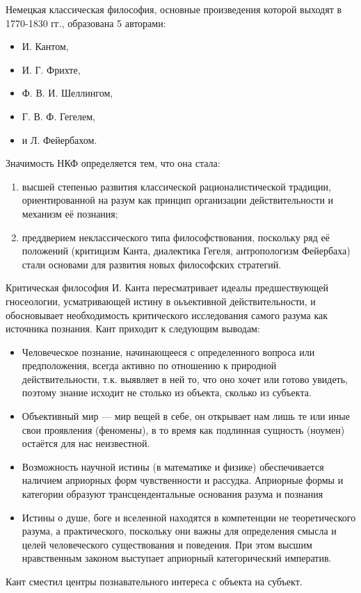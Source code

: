 
Немецкая классическая философия, основные произведения которой выходят в 1770-1830 гг., образована 5 авторами:
\begin{itemize}
    \item И. Кантом,
    \item И. Г. Фрихте,
    \item Ф. В. И. Шеллингом,
    \item Г. В. Ф. Гегелем,
    \item и Л. Фейербахом.
\end{itemize}

Значимость НКФ определяется тем, что она стала:
\begin{enumerate}
    \item высшей степенью развития классической рационалистической традиции, ориентированной на разум как принцип организации действительности и механизм её познания;
    \item преддверием неклассического типа философствования, поскольку ряд её положений (критицизм Канта, диалектика Гегеля, антропологизм Фейербаха) стали основами для развития новых философских стратегий.
\end{enumerate}

Критическая философия И. Канта пересматривает идеалы предшествующей гносеологии, усматривающей истину в оьъективной действительности, и обосновывает необходимость критического исследования самого разума как источника познания. Кант приходит к следующим выводам:
\begin{itemize}
    \item Человеческое познание, начинающееся с определенного вопроса или предположения, всегда активно по отношению к природной действительности, т.к. выявляет в ней то, что оно хочет или готово увидеть, поэтому знание исходит не столько из объекта, сколько из субъекта.
    \item Объективный мир --- мир вещей в себе, он открывает нам лишь те или иные свои проявления (феномены), в то время как подлинная сущность (ноумен) остаётся для нас неизвестной.
    \item Возможность научной истины (в математике и физике) обеспечивается наличием априорных форм чувственности и рассудка. Априорные формы и категории образуют трансцендентальные основания разума и познания
    \item Истины о душе, боге и вселенной находятся в компетенции не теоретического разума, а практического, поскольку они важны для определения смысла и целей человеческого существования и поведения. При этом высшим нравственным законом выступает априорный категорический императив.
\end{itemize}

Кант сместил центры познавательного интереса с объекта на субъект.